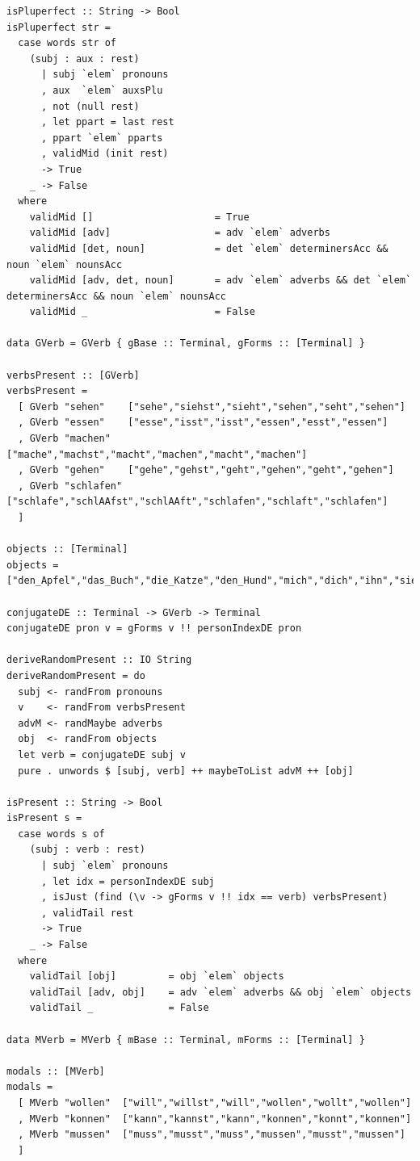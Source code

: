 \documentclass[areasetadvanced]{scrartcl}
\begin{document}
\begin{lstlisting}
isPluperfect :: String -> Bool
isPluperfect str =
  case words str of
    (subj : aux : rest)
      | subj `elem` pronouns
      , aux  `elem` auxsPlu
      , not (null rest)
      , let ppart = last rest
      , ppart `elem` pparts
      , validMid (init rest)
      -> True
    _ -> False
  where
    validMid []                     = True
    validMid [adv]                  = adv `elem` adverbs
    validMid [det, noun]            = det `elem` determinersAcc && noun `elem` nounsAcc
    validMid [adv, det, noun]       = adv `elem` adverbs && det `elem` determinersAcc && noun `elem` nounsAcc
    validMid _                      = False

data GVerb = GVerb { gBase :: Terminal, gForms :: [Terminal] }  

verbsPresent :: [GVerb]
verbsPresent =
  [ GVerb "sehen"    ["sehe","siehst","sieht","sehen","seht","sehen"]
  , GVerb "essen"    ["esse","isst","isst","essen","esst","essen"]
  , GVerb "machen"   ["mache","machst","macht","machen","macht","machen"]
  , GVerb "gehen"    ["gehe","gehst","geht","gehen","geht","gehen"]
  , GVerb "schlafen" ["schlafe","schlAAfst","schlAAft","schlafen","schlaft","schlafen"]
  ]

objects :: [Terminal]
objects = ["den_Apfel","das_Buch","die_Katze","den_Hund","mich","dich","ihn","sie","es","nichts"]

conjugateDE :: Terminal -> GVerb -> Terminal
conjugateDE pron v = gForms v !! personIndexDE pron

deriveRandomPresent :: IO String
deriveRandomPresent = do
  subj <- randFrom pronouns
  v    <- randFrom verbsPresent
  advM <- randMaybe adverbs
  obj  <- randFrom objects
  let verb = conjugateDE subj v
  pure . unwords $ [subj, verb] ++ maybeToList advM ++ [obj]

isPresent :: String -> Bool
isPresent s =
  case words s of
    (subj : verb : rest)
      | subj `elem` pronouns
      , let idx = personIndexDE subj
      , isJust (find (\v -> gForms v !! idx == verb) verbsPresent)
      , validTail rest
      -> True
    _ -> False
  where
    validTail [obj]         = obj `elem` objects
    validTail [adv, obj]    = adv `elem` adverbs && obj `elem` objects
    validTail _             = False

data MVerb = MVerb { mBase :: Terminal, mForms :: [Terminal] }

modals :: [MVerb]
modals =
  [ MVerb "wollen"  ["will","willst","will","wollen","wollt","wollen"]
  , MVerb "konnen"  ["kann","kannst","kann","konnen","konnt","konnen"]
  , MVerb "mussen"  ["muss","musst","muss","mussen","musst","mussen"]
  ]


\end{lstlisting}
\end{document}
